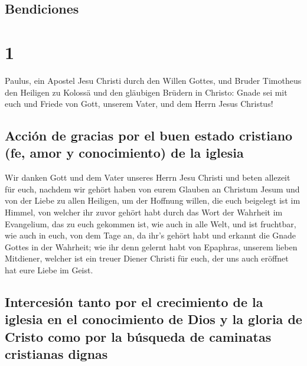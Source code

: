 \hypertarget{bendiciones}{%
\subsection{Bendiciones}\label{bendiciones}}

\hypertarget{section}{%
\section{1}\label{section}}

 Paulus, ein Apostel Jesu Christi durch den Willen Gottes,
und Bruder Timotheus  den Heiligen zu Kolossä und den
gläubigen Brüdern in Christo: Gnade sei mit euch und Friede von Gott,
unserem Vater, und dem Herrn Jesus Christus!

\hypertarget{acciuxf3n-de-gracias-por-el-buen-estado-cristiano-fe-amor-y-conocimiento-de-la-iglesia}{%
\subsection{Acción de gracias por el buen estado cristiano (fe, amor y
conocimiento) de la
iglesia}\label{acciuxf3n-de-gracias-por-el-buen-estado-cristiano-fe-amor-y-conocimiento-de-la-iglesia}}

 Wir danken Gott und dem Vater unseres Herrn Jesu Christi
und beten allezeit für euch,  nachdem wir gehört haben von
eurem Glauben an Christum Jesum und von der Liebe zu allen Heiligen,
 um der Hoffnung willen, die euch beigelegt ist im Himmel,
von welcher ihr zuvor gehört habt durch das Wort der Wahrheit im
Evangelium,  das zu euch gekommen ist, wie auch in alle
Welt, und ist fruchtbar, wie auch in euch, von dem Tage an, da ihr's
gehört habt und erkannt die Gnade Gottes in der Wahrheit; 
wie ihr denn gelernt habt von Epaphras, unserem lieben Mitdiener,
welcher ist ein treuer Diener Christi für euch,  der uns
auch eröffnet hat eure Liebe im Geist.

\hypertarget{intercesiuxf3n-tanto-por-el-crecimiento-de-la-iglesia-en-el-conocimiento-de-dios-y-la-gloria-de-cristo-como-por-la-buxfasqueda-de-caminatas-cristianas-dignas}{%
\subsection{Intercesión tanto por el crecimiento de la iglesia en el
conocimiento de Dios y la gloria de Cristo como por la búsqueda de
caminatas cristianas
dignas}\label{intercesiuxf3n-tanto-por-el-crecimiento-de-la-iglesia-en-el-conocimiento-de-dios-y-la-gloria-de-cristo-como-por-la-buxfasqueda-de-caminatas-cristianas-dignas}}

